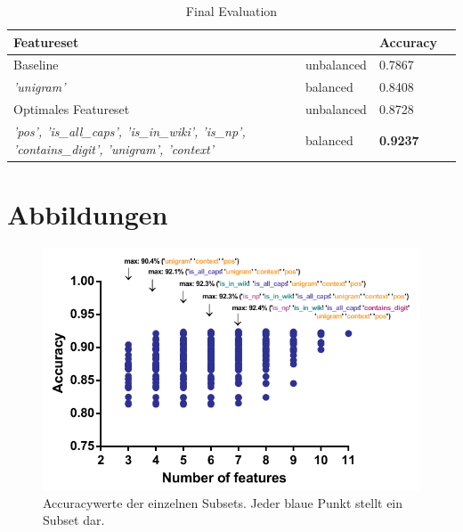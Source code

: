 \documentclass[bibliography=totoc]{scrartcl}
\begin{document}
\begin{appendices}
					\begin{table}[H]
						\centering
						\caption{Final Evaluation}
						
						\begin{tabular}{llll}
							Featureset & & Accuracy\\
							\toprule
							Baseline & unbalanced & 0.7867\\
							\tiny\textit{'unigram'} & balanced & 0.8408\\
							Optimales Featureset	 & unbalanced & 0.8728\\
							\tiny\textit{'pos', 'is\_all\_caps', 'is\_in\_wiki', 'is\_np', 'contains\_digit', 'unigram', 'context'}		 & balanced & \textbf{0.9237}\\
							\bottomrule
						\end{tabular}
						\label{tab:result}
					\end{table}	
					
		\clearpage
		\section{Abbildungen}
		\begin{figure}[H]
			\centering
			\includegraphics{accuracy.pdf}
			\caption{Accuracywerte der einzelnen Subsets. Jeder blaue Punkt stellt ein Subset dar.}
			\label{tab:accuracy}
		\end{figure}
		

\end{appendices}
\end{document}
